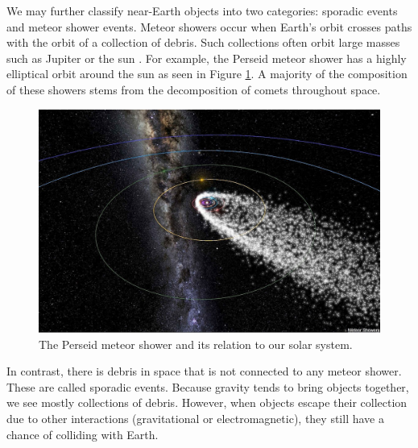 We may further classify near-Earth objects into two categories: sporadic events and meteor shower events.
Meteor showers occur when Earth's orbit crosses paths with the orbit of a collection of debris. 
Such collections often orbit large masses such as Jupiter or the sun \cite{trigo-rodriguez_2006_2007}.  
For example, the Perseid meteor shower has a highly elliptical orbit around the sun as seen in Figure \ref{perceid}.  
A majority of the composition of these showers stems from the decomposition of comets throughout space.

\begin{figure}[ht!]
  \centering
  \includegraphics[scale=0.7]{images/persiod_shower.jpg}
  \caption{The Perseid meteor shower and its relation to our solar system.}
  \label{perceid}
\end{figure}

In contrast, there is debris in space that is not connected to any meteor shower. 
These are called sporadic events. 
Because gravity tends to bring objects together, we see mostly collections of debris.
However, when objects escape their collection due to other interactions (gravitational or electromagnetic), they still have a chance of colliding with Earth.

